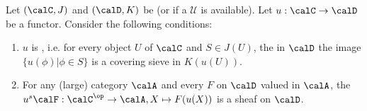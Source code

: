 \begin{proposition} \label{proposition:equivalent_conditions_for_continuous_functor_of_sites}
Let $(\calC,J)$ and $(\calD,K)$ be  (or  if a  $\mathscr{U}$ is available). Let $u : \calC \to \calD$ be a functor. Consider the following conditions:
\begin{enumerate}

    \item \label{item:continuous_functor_of_sites_pushforward_of_sieves_definition} $u$ is , i.e. for every object $U$ of $\calC$ and  $S \in J(U)$, the  in $\calD$  the image $\{u(\phi) | \phi \in S\}$ is a covering sieve in $K(u(U))$.



    \item \label{item:continuous_functor_of_sites_sheaf_valued_in_general_category_definition} For any (large) category $\calA$ and every  $F$ on $\calD$ valued in $\calA$, the  $u^s \calF: \calC^{\op} \to \calA, X \mapsto F(u(X))$ is a sheaf on $\calD$. 


\end{enumerate}
\end{proposition}
